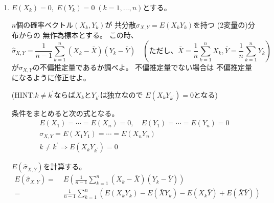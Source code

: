 \documentclass[12pt,b5paper]{ltjsarticle}
\begin{document}
\begin{enumerate}
 \item
      $E(X_{k})=0,\; E(Y_{k})=0 \; (k=1,\dots,n)$とする。

      $n$個の確率ベクトル$(X_{k},Y_{k})$が
      共分散$\sigma_{X,Y}=E(X_{k}Y_{k})$を持つ
      (2変量の)分布からの
      無作為標本とする。
      この時、
      \begin{equation}
       \hat{\sigma}_{X,Y}
        =\frac{1}{n-1}\sum_{k=1}^{n}(X_{k}-\bar{X})(Y_{k}-\bar{Y})
        \quad
        (ただし、\bar{X}=\frac{1}{n}\sum_{k=1}^{n}X_{k},
        \bar{Y}=\frac{1}{n}\sum_{k=1}^{n}Y_{k})
      \end{equation}
      が$\sigma_{X,Y}$の不偏推定量であるか調べよ。
      不偏推定量でない場合は
      不偏推定量になるように修正せよ。

      (HINT:$k\ne k^{\prime}$ならば$X_{k}$と$Y_{k^{\prime}}$は独立なので
      $E(X_{k}Y_{k^{\prime}})=0$となる)

      \dotfill

      条件をまとめると次の式となる。
      \begin{gather}
       E(X_{1})=\cdots=E(X_{n})=0,\quad E(Y_{1})=\cdots=E(Y_{n})=0\\
       \sigma_{X,Y}=E(X_{1}Y_{1})=\cdots=E(X_{n}Y_{n})\\
       k\ne k^{\prime} \Rightarrow E(X_{k}Y_{k^{\prime}})=0
      \end{gather}



      $E(\hat{\sigma}_{X,Y})$を計算する。
      \begin{align}
       E(\hat{\sigma}_{X,Y})
        =&\; E\left(\frac{1}{n-1}\sum_{k=1}^{n}(X_{k}-\bar{X})(Y_{k}-\bar{Y})\right)\\
        =&\; \frac{1}{n-1}\sum_{k=1}^{n}(E(X_{k}Y_{k}) -E(\bar{X}Y_{k})-E(X_{k}\bar{Y}) + E(\bar{X}\bar{Y}) )
      \end{align}


\end{enumerate}
\end{document}
